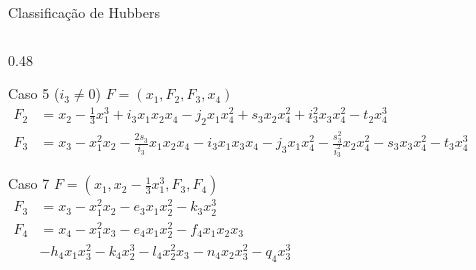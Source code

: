 \begin{frame}{Classificação de Hubbers}
    \footnotesize
    \begin{columns}[t]
        \begin{column}{0.48\textwidth}
            \begin{block}{Caso 5 ($i_3 \neq 0$)}
                $F = (x_1, F_2, F_3, x_4)$ \\
                \tiny
                $\begin{aligned}
                    F_2 &= x_2 - \tfrac{1}{3} x_1^3 + i_3 x_1 x_2 x_4 - j_2 x_1 x_4^2 
                    + s_3 x_2 x_4^2 + i_3^2 x_3 x_4^2 - t_2 x_4^3 \\
                    F_3 &= x_3 - x_1^2 x_2 - \tfrac{2 s_3}{i_3} x_1 x_2 x_4 - i_3 x_1 x_3 x_4 
                    - j_3 x_1 x_4^2 - \tfrac{s_3^2}{i_3^2} x_2 x_4^2 - s_3 x_3 x_4^2 - t_3 x_4^3
                \end{aligned}$
            \end{block}
\vspace{0.99cm}
            \begin{block}{Caso 7}
                $F = (x_1, x_2 - \tfrac{1}{3} x_1^3, F_3, F_4)$ \\
                \vspace{0.2em}
                $\begin{aligned}
                    F_3 &= x_3 - x_1^2 x_2 - e_3 x_1 x_2^2 - k_3 x_2^3 \\
                    F_4 &= x_4 - x_1^2 x_3 - e_4 x_1 x_2^2 - f_4 x_1 x_2 x_3 \\
                    &- h_4 x_1 x_3^2 - k_4 x_2^3 - l_4 x_2^2 x_3 - n_4 x_2 x_3^2 - q_4 x_3^3
                \end{aligned}$
            \end{block}
        \end{column}
        

\end{columns}
\end{frame}
